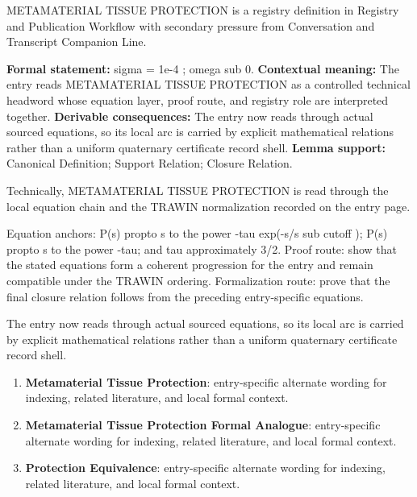 
\begingroup\small
{}
METAMATERIAL TISSUE PROTECTION is a registry definition in Registry and Publication Workflow with secondary pressure from Conversation and Transcript Companion Line.

\begingroup\footnotesize\setlength{\emergencystretch}{3em}\sloppy
\textbf{Formal statement:} sigma = 1e-4 ; omega sub 0. \textbf{Contextual meaning:} The entry reads METAMATERIAL TISSUE PROTECTION as a controlled technical headword whose equation layer, proof route, and registry role are interpreted together. \textbf{Derivable consequences:} The entry now reads through actual sourced equations, so its local arc is carried by explicit mathematical relations rather than a uniform quaternary certificate record shell. \textbf{Lemma support:} Canonical Definition; Support Relation; Closure Relation.\par
\endgroup

Technically, METAMATERIAL TISSUE PROTECTION is read through the local equation chain and the TRAWIN normalization recorded on the entry page.

Equation anchors: P(s) propto s to the power -tau exp(-s/s sub cutoff ); P(s) propto s to the power -tau; and tau approximately 3/2. Proof route: show that the stated equations form a coherent progression for the entry and remain compatible under the TRAWIN ordering. Formalization route: prove that the final closure relation follows from the preceding entry-specific equations.

The entry now reads through actual sourced equations, so its local arc is carried by explicit mathematical relations rather than a uniform quaternary certificate record shell.
\endgroup

\begin{enumerate}[leftmargin=1.6em,itemsep=6pt,topsep=4pt]
\item \textbf{Metamaterial Tissue Protection}: entry-specific alternate wording for indexing, related literature, and local formal context.
\item \textbf{Metamaterial Tissue Protection Formal Analogue}: entry-specific alternate wording for indexing, related literature, and local formal context.
\item \textbf{Protection Equivalence}: entry-specific alternate wording for indexing, related literature, and local formal context.
\end{enumerate}

